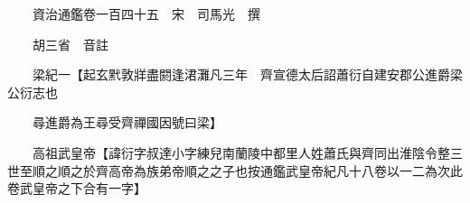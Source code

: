 










 


 
 


 

  
  
  
  
  





  
  
  
  
  
 
  

  

  
  
  



  

 
 

  
   




  

  
  


  　　資治通鑑卷一百四十五　宋　司馬光　撰

　　胡三省　音註

　　梁紀一【起玄黓敦牂盡閼逢涒灘凡三年　齊宣德太后詔蕭衍自建安郡公進爵梁公衍志也

　　尋進爵為王尋受齊禪國因號曰梁】

　　高祖武皇帝【諱衍字叔達小字練兒南蘭陵中都里人姓蕭氏與齊同出淮陰令整三世至順之順之於齊高帝為族弟帝順之之子也按通鑑武皇帝紀凡十八卷以一二為次此卷武皇帝之下合有一字】

